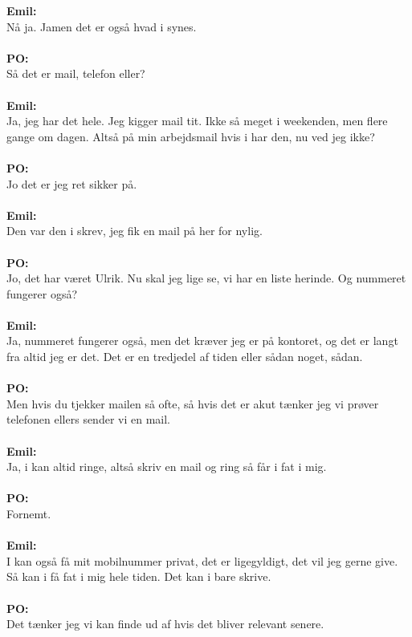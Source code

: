 \textbf{Emil:}\\
Nå ja.
Jamen det er også hvad i synes.
\\\\
\textbf{PO:}\\
Så det er mail, telefon eller?
\\\\
\textbf{Emil:}\\
Ja, jeg har det hele.
Jeg kigger mail tit. 
Ikke så meget i weekenden, men flere gange om dagen.
Altså på min arbejdsmail hvis i har den, nu ved jeg ikke?
\\\\
\textbf{PO:}\\
Jo det er jeg ret sikker på.
\\\\
\textbf{Emil:}\\
Den var den i skrev, jeg fik en mail på her for nylig.
\\\\
\textbf{PO:}\\
Jo, det har været Ulrik. Nu skal jeg lige se, vi har en liste herinde.
Og nummeret fungerer også?
\\\\
\textbf{Emil:}\\
Ja, nummeret fungerer også, men det kræver jeg er på kontoret, og det er langt fra altid jeg er det.
Det er en tredjedel af tiden eller sådan noget, sådan.
\\\\
\textbf{PO:}\\
Men hvis du tjekker mailen så ofte, så hvis det er akut tænker jeg vi prøver telefonen ellers sender vi en mail.
\\\\
\textbf{Emil:}\\
Ja, i kan altid ringe, altså skriv en mail og ring så får i fat i mig.
\\\\
\textbf{PO:}\\
Fornemt.
\\\\
\textbf{Emil:}\\
I kan også få mit mobilnummer privat, det er ligegyldigt, det vil jeg gerne give. 
Så kan i få fat i mig hele tiden.
Det kan i bare skrive.
\\\\
\textbf{PO:}\\
Det tænker jeg vi kan finde ud af hvis det bliver relevant senere.
\\\\
